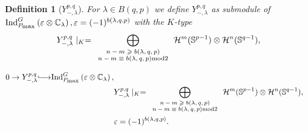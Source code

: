 \documentclass[12pt]{article} %
\theoremstyle{plain}
\newtheorem{definition}{Definition}
\theoremstyle{remark}
\newcommand{\longhookrightarrow}{{\lhook\joinrel\relbar\joinrel\rightarrow}}
\newcommand{\tmscript}[1]{ {\scriptsize #1} }
\newcommand{\assign}{:=}
\newcommand{\myInd}[1]{\mbox{Ind}_{P_{\mbox{\scriptsize\rmfamily max}}}^G\left( \varepsilon\otimes \C_{#1} \right)}
\begin{document}
\begin{definition}[$Y_{-,\lambda}^{p,q}$]
	For $\lambda\in B(q,p)$	we
	 define $Y_{-,\lambda}^{p,q}$ as submodule of $\myInd{\lambda},\varepsilon=(-1)^{b(\lambda,q,p)}$ with the $K$-type
	\begin{equation*}
		\begin{array}[]{c}
   Y_{-, \lambda}^{p, q} \mid_K = \displaystyle\bigoplus_{\tmscript{\begin{array}{c}
    n-m \geqslant b (\lambda, q,p)\\
    n-m \equiv b (\lambda, q, p) \mbox{mod} 2
  \end{array}}} \mathcal{H}^m (\mathbb{S}^{p - 1}) \otimes \mathcal{H}^n
  (\mathbb{S}^{q - 1}),\\
		\end{array}
	\end{equation*}
\end{definition}
\begin{eqnarray}
  0 \rightarrow Y_{-, \lambda}^{p, q} \longhookrightarrow
  \myInd{\lambda}, &
  \nonumber\\
  & Y_{-, \lambda}^{p, q} \mid_K = \displaystyle\bigoplus_{\tmscript{\begin{array}{c}
    n - m \geqslant b (\lambda, q, p)\\
    n - m \equiv b (\lambda, q, p) \mbox{mod} 2
  \end{array}}} \mathcal{H}^m (\mathbb{S}^{p - 1}) \otimes \mathcal{H}^n
  (\mathbb{S}^{q - 1}),  \label{eqn:20-beminus} & \\
  & \varepsilon = (- 1)^{b (\lambda, q, p)} . &  \nonumber
\end{eqnarray}
\end{document}
